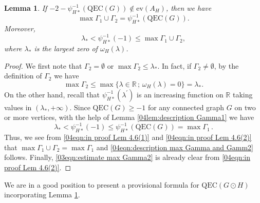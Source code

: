 \documentclass[12pt,a4paper]{article}
\newtheorem{lemma}[theorem]{Lemma}
\newcommand{\1}{{\bm 1}}
\numberwithin{equation}{section}
\begin{document}
\begin{lemma}\label{04lem:description Gamma1 and Gamma2}
If $-2-\psi_{H*}^{-1}(\mathrm{QEC}(G)) \not\in\mathrm{ev}(A_H)$,
then we have
%
\begin{equation}\label{04eqn:description max Gamma and Gamm2}
\max \Gamma_1\cup\Gamma_2=\psi_{H*}^{-1}(\mathrm{QEC}(G)).
\end{equation}
%
Moreover,
\begin{equation}\label{03eqn:estimate max Gamma2}
\lambda_*<\psi_{H*}^{-1}(-1) \le\max \Gamma_1\cup\Gamma_2,
\end{equation}
where $\lambda_*$ is the largest zero of $\omega_H(\lambda)$.
\end{lemma}

\begin{proof}
We first note that $\Gamma_2=\emptyset$ or $\max\Gamma_2\le\lambda_*$.
In fact, if $\Gamma_2 \neq\emptyset$,
by the definition of $\Gamma_2$ we have
%
\begin{equation}\label{04eqn:in proof Lem 4.6(1)}
\max\Gamma_2
\le\max\{\lambda\in\mathbb{R}\,;\,\omega_H(\lambda)=0\}=\lambda_*.
\end{equation}
%
On the other hand, 
recall that $\psi_{H*}^{-1}(\lambda^\prime)$ is
an increasing function on $\mathbb{R}$ taking
values in $(\lambda_*,+\infty)$.
Since $\mathrm{QEC}(G)\ge-1$ for any 
connected graph $G$ on two or more vertices,
with the help of Lemma \ref{04lem:description Gamma1} we have
%
\begin{equation}\label{04eqn:in proof Lem 4.6(2)}
\lambda_*<\psi_{H*}^{-1}(-1) 
\le \psi_{H*}^{-1}(\mathrm{QEC}(G))
=\max\Gamma_1\,.
\end{equation}
Thus, we see from
\eqref{04eqn:in proof Lem 4.6(1)} and
\eqref{04eqn:in proof Lem 4.6(2)} 
that $\max\Gamma_1\cup\Gamma_2=\max\Gamma_1$
and \eqref{04eqn:description max Gamma and Gamm2} follows.
Finally, \eqref{03eqn:estimate max Gamma2} is already clear
from \eqref{04eqn:in proof Lem 4.6(2)}.
\end{proof}

We are in a good position to 
present a provisional formula for $\mathrm{QEC}(G\odot H)$
incorporating Lemma \ref{04lem:description Gamma1 and Gamma2}.
\end{document}
